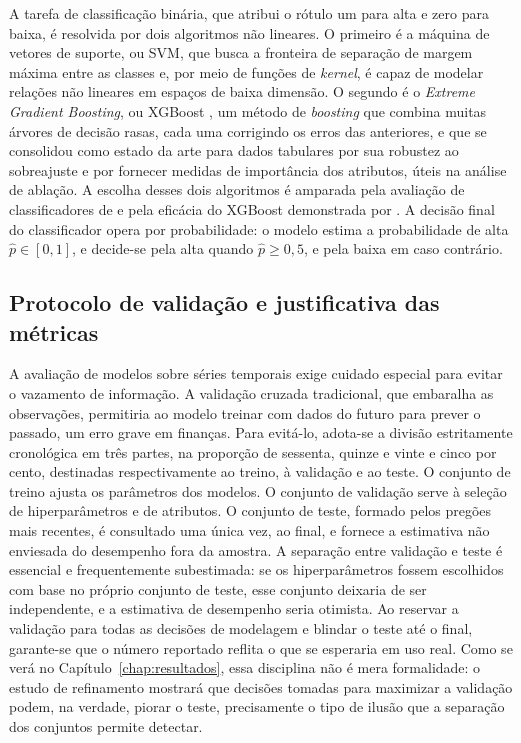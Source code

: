 A tarefa de classificação binária, que atribui o rótulo um para alta e zero para baixa, é resolvida por dois algoritmos não lineares. O primeiro é a máquina de vetores de suporte, ou SVM, que busca a fronteira de separação de margem máxima entre as classes e, por meio de funções de \textit{kernel}, é capaz de modelar relações não lineares em espaços de baixa dimensão. O segundo é o \textit{Extreme Gradient Boosting}, ou XGBoost \cite{chen_xgboost_2016}, um método de \textit{boosting} que combina muitas árvores de decisão rasas, cada uma corrigindo os erros das anteriores, e que se consolidou como estado da arte para dados tabulares por sua robustez ao sobreajuste e por fornecer medidas de importância dos atributos, úteis na análise de ablação. A escolha desses dois algoritmos é amparada pela avaliação de classificadores de  e pela eficácia do XGBoost demonstrada por . A decisão final do classificador opera por probabilidade: o modelo estima a probabilidade de alta $\hat{p} \in [0,1]$, e decide-se pela alta quando $\hat{p} \ge 0{,}5$, e pela baixa em caso contrário.

\subsection{Protocolo de validação e justificativa das métricas}

A avaliação de modelos sobre séries temporais exige cuidado especial para evitar o vazamento de informação. A validação cruzada tradicional, que embaralha as observações, permitiria ao modelo treinar com dados do futuro para prever o passado, um erro grave em finanças. Para evitá-lo, adota-se a divisão estritamente cronológica em três partes, na proporção de sessenta, quinze e vinte e cinco por cento, destinadas respectivamente ao treino, à validação e ao teste. O conjunto de treino ajusta os parâmetros dos modelos. O conjunto de validação serve à seleção de hiperparâmetros e de atributos. O conjunto de teste, formado pelos pregões mais recentes, é consultado uma única vez, ao final, e fornece a estimativa não enviesada do desempenho fora da amostra. A separação entre validação e teste é essencial e frequentemente subestimada: se os hiperparâmetros fossem escolhidos com base no próprio conjunto de teste, esse conjunto deixaria de ser independente, e a estimativa de desempenho seria otimista. Ao reservar a validação para todas as decisões de modelagem e blindar o teste até o final, garante-se que o número reportado reflita o que se esperaria em uso real. Como se verá no Capítulo~\ref{chap:resultados}, essa disciplina não é mera formalidade: o estudo de refinamento mostrará que decisões tomadas para maximizar a validação podem, na verdade, piorar o teste, precisamente o tipo de ilusão que a separação dos conjuntos permite detectar.

